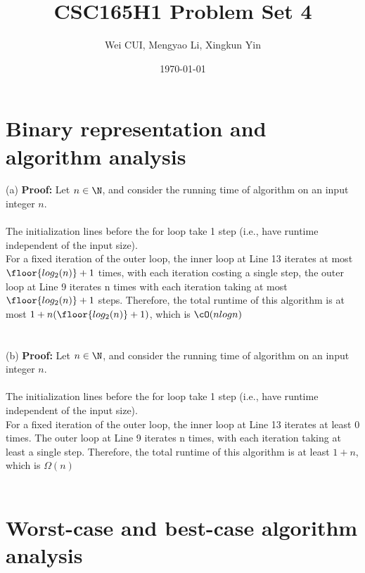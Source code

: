 \documentclass[12pt]{article}
\title{CSC165H1
Problem Set 4}
\author{Wei CUI, Mengyao Li, Xingkun Yin}
\date{\today}
\begin{document}
\maketitle
\section{Binary representation and algorithm analysis}

(a) \textbf{Proof:} Let $n \in \N$, and consider the running time of algorithm on an input integer $n$.\\
\\
The initialization lines before the for loop take 1 step (i.e., have runtime independent of the input size).\\
For a fixed iteration of the outer loop, the inner loop at Line 13 iterates at most $\floor{log_2(n)} + 1$ times, with each iteration costing a single step, the outer loop at Line 9 iterates n times with each iteration taking at most $\floor{log_2(n)} + 1$ steps. Therefore, the total runtime of this algorithm is at most $1 + n(\floor{log_2(n)} + 1)$, which is $\cO(nlogn)$\\
\\
\\
(b) \textbf{Proof:} Let $n \in \N$, and consider the running time of algorithm on an input integer $n$.\\
\\
The initialization lines before the for loop take 1 step (i.e., have runtime independent of the input size).\\
For a fixed iteration of the outer loop, the inner loop at Line 13 iterates at least 0 times. The outer loop at Line 9 iterates n times, with each iteration taking at least a single step. Therefore, the total runtime of this algorithm is at least $1 + n$, which is $\Omega(n)$\\
\\

\section{Worst-case and best-case algorithm analysis}
\end{document}
